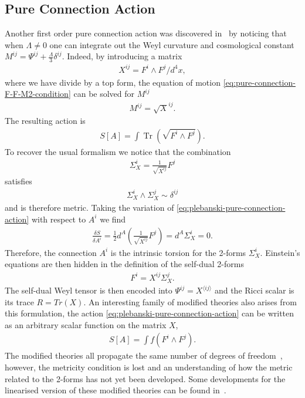 \documentclass[10pt]{report}
\theoremstyle{definition}
\DeclareMathOperator{\Tr}{Tr}
\begin{document}
\subsection{Pure Connection Action}
Another first order pure connection action was discovered in~\cite{Pure_Connection_Krasno_2011} by noticing that when $\Lambda \neq 0$ one can integrate out the Weyl curvature and cosmological constant $M^{ij} = \Psi^{ij} + \frac{\Lambda}{3} \delta^{ij}$. Indeed, by introducing a matrix 
\begin{align}
    X^{ij} = F^i \wedge F^j / d^4x,
\end{align}
where we have divide by a top form, the equation of motion \cref{eq:pure-connection-F-F-M2-condition} can be solved for $M^{ij}$
\begin{align}
    M^{ij} = \sqrt{X}^{ij}.
\end{align}
The resulting action is 
\begin{align}
    S[A] = \int \Tr(\sqrt{F^i \wedge F^j}). \label{eq:plebanski-pure-connection-action}
\end{align}
To recover the usual formalism we notice that the combination
\begin{align}
    \Sigma^i_X = \frac{1}{\sqrt{X^{ij}}} F^j
\end{align}
satisfies 
\begin{align}
    \Sigma^i_X \wedge \Sigma^j_X \sim \delta^{ij}
\end{align}
and is therefore metric. Taking the variation of \cref{eq:plebanski-pure-connection-action} with respect to $A^i$ we find 
\begin{align}
    \frac{\delta S}{\delta A^i} = \frac{1}{2} d^A \left( \frac{1}{\sqrt{X^{ij}}} F^j \right) = d^A \Sigma^i_X = 0.
\end{align} 
Therefore, the connection $A^i$ is the intrinsic torsion for the 2-forms $\Sigma^i_X$. Einstein's equations are then hidden in the definition of the self-dual 2-forms
\begin{align}
    F^i = X^{ij} \Sigma^j_X.
\end{align}
The self-dual Weyl tensor is then encoded into $\Psi^{ij} = X^{\langle ij\rangle }$ and the Ricci scalar is its trace $R = Tr(X)$. An interesting family of modified theories also arises from this formulation, the action \cref{eq:plebanski-pure-connection-action} can be written as an arbitrary scalar function on the matrix $X$, 
\begin{align}
    S[A] = \int f(F^i \wedge F^j).
\end{align}
The modified theories all propagate the same number of degrees of freedom~\cite{A_Gauge_Theoret_Krasno_2012}, however, the metricity condition is lost and an understanding of how the metric related to the 2-forms has not yet been developed. Some developments for the linearised version of these modified theories can be found in~\cite{ModifiedGravitFreide2008}.
\end{document}
